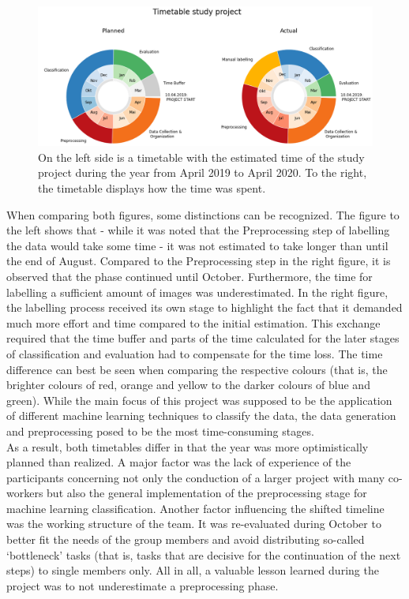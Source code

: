 \begin{figure}[h]
	\centering
	\includegraphics[scale=0.4]{Figures/chapter02/fig_timetable}
	\decoRule
	\caption[Timetable of the project]{On the left side is a timetable with the estimated time of the study project during the year from April 2019 to April 2020. To the right, the timetable displays how the time was spent.}
	\label{fig:Timetable}
\end{figure}

When comparing both figures, some distinctions can be recognized. The figure to the left shows that - while it was noted that the Preprocessing step of labelling the data would take some time - it was not estimated to take longer than until the end of August. Compared to the Preprocessing step in the right figure, it is observed that the phase continued until October. Furthermore, the time for labelling a sufficient amount of images was underestimated. In the right figure, the labelling process received its own stage to highlight the fact that it demanded much more effort and time compared to the initial estimation.
This exchange required that the time buffer and parts of the time calculated for the later stages of classification and evaluation had to compensate for the time loss.
The time difference can best be seen when comparing the respective colours (that is, the brighter colours of red, orange and yellow to the darker colours of blue and green). While the main focus of this project was supposed to be the application of different machine learning techniques to classify the data, the data generation and preprocessing posed to be the most time-consuming stages. \\
As a result, both timetables differ in that the year was more optimistically planned than realized. A major factor was the lack of experience of the participants concerning not only the conduction of a larger project with many co-workers but also the general implementation of the preprocessing stage for machine learning classification. Another factor influencing the shifted timeline was the working structure of the team. It was re-evaluated during October to better fit the needs of the group members and avoid distributing so-called ‘bottleneck’ tasks (that is, tasks that are decisive for the continuation of the next steps) to single members only. All in all, a valuable lesson learned during the project was to not underestimate a preprocessing phase. \\

